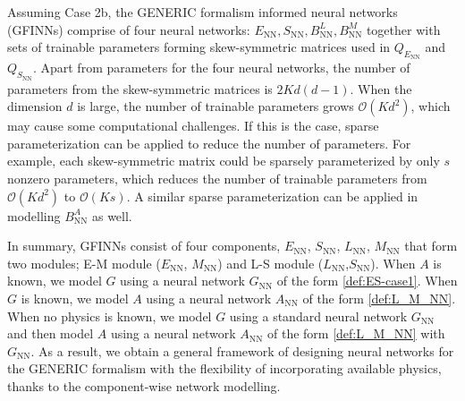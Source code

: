 \documentclass[openacc]{rsproca_new}%
\newtheorem{remark}{Remark}
\begin{document}







Assuming Case 2b, 
the GENERIC formalism informed neural networks (GFINNs) comprise of four neural networks:
$E_{\text{NN}}, S_{\text{NN}}, B_{\text{NN}}^L, B_{\text{NN}}^M$
together with sets of trainable parameters forming 
skew-symmetric matrices used in $Q_{E_{\text{NN}}}$
and $Q_{S_{\text{NN}}}$.
Apart from parameters for the four neural networks,
the number of parameters from the skew-symmetric matrices 
is $2Kd(d-1)$.
When the dimension $d$ is large, 
the number of trainable parameters grows $\mathcal{O}(Kd^2)$,
which may cause some computational challenges.
If this is the case, 
sparse parameterization can be applied to reduce the number of parameters. 
For example, 
each skew-symmetric matrix could be sparsely parameterized by only $s$ nonzero parameters,
which reduces the number of trainable parameters from $\mathcal{O}(Kd^2)$ to $\mathcal{O}(Ks)$.
A similar sparse parameterization can be applied in
modelling $B_{\text{NN}}^A$ as well.





In summary, 
GFINNs
consist of four components, 
$E_{\text{NN}}$, $S_{\text{NN}}$,
$L_{\text{NN}}$, $M_{\text{NN}}$
that form two modules; E-M module ($E_{\text{NN}}$, $M_{\text{NN}}$)
and L-S module ($L_{\text{NN}}$,$S_{\text{NN}}$).
When $A$ is known, 
we model $G$ using a neural network $G_{\text{NN}}$
of the form \eqref{def:ES-case1}.
When $G$ is known,
we model $A$ using a neural network $A_{\text{NN}}$
of the form \eqref{def:L_M_NN}.
When no physics is known,
we model $G$ using a standard neural network
$G_{\text{NN}}$
and then model $A$ using a neural network $A_{\text{NN}}$
of the form \eqref{def:L_M_NN}
with $G_{\text{NN}}$.
As a result, we obtain 
a general framework of designing neural networks 
for the GENERIC formalism 
with the flexibility of incorporating available physics,
thanks to the component-wise network modelling. 
\end{document}
